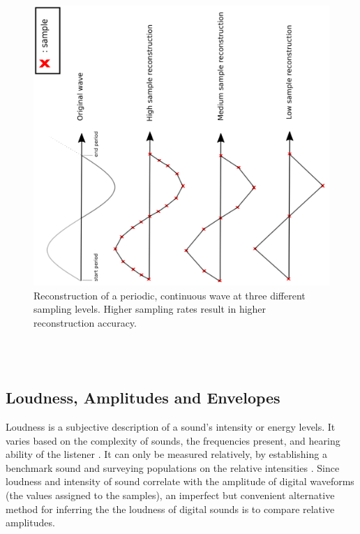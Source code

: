 \documentclass[\main/thesis.tex]{subfiles}
\begin{document}

\begin{figure}[h]
\label{fig_sampling_rate}
\centering
\includegraphics[width=1\linewidth,angle =-90 ]{images/periodic_function_decimation.png}
\caption{Reconstruction of a periodic, continuous wave at three different sampling levels. Higher sampling rates result in higher reconstruction accuracy. } %
\end{figure}

\\\\
\subsection{Loudness, Amplitudes and Envelopes}
Loudness is a subjective description of a sound's intensity or energy levels. It varies based on the complexity of sounds, the frequencies present, and hearing ability of the listener \cite{fletcher1933loudness,cook1999chap6}. It can only be measured relatively, by establishing a benchmark sound and surveying populations on the relative intensities \cite{cook1999chap6}. Since loudness and intensity of sound correlate with the amplitude of digital waveforms (the values assigned to the samples), an imperfect but convenient alternative method for inferring the the loudness of digital sounds is to compare relative amplitudes. 
\end{document}
